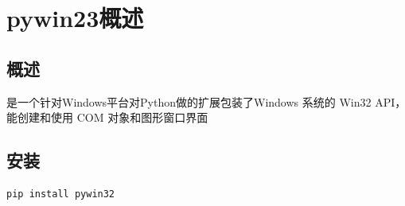\chapter{pywin23概述}

\section{概述}
是一个针对Windows平台对Python做的扩展包装了Windows 系统的 Win32 API，能创建和使用 COM 对象和图形窗口界面

\section{安装}
\begin{lstlisting}[style=demostyle,numbers=none]
pip install pywin32 
\end{lstlisting}


